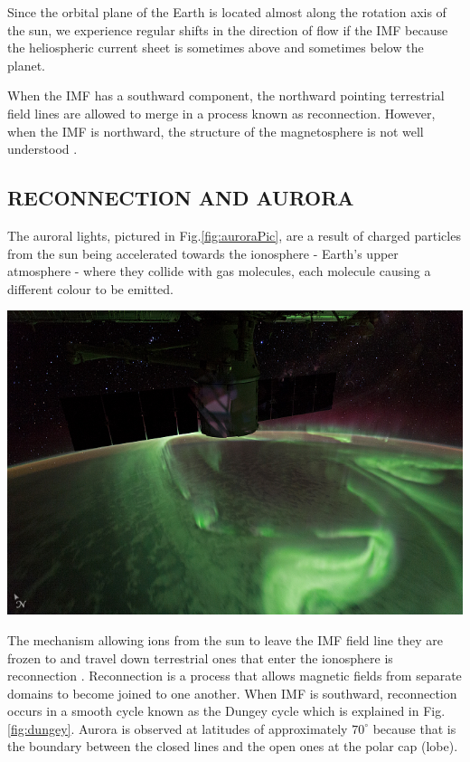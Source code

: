 \documentclass{article}
\newenvironment{Figure}
  {\par\medskip\noindent\minipage{\linewidth}}
  {\endminipage\par\medskip}
\begin{document}
\begin{multicols}{2}
Since the orbital plane of the Earth is located almost along the rotation axis of the sun, we experience regular shifts in the direction of flow if the IMF because the heliospheric current sheet is sometimes above and sometimes below the planet. 

When the IMF has a southward component, the northward pointing terrestrial field lines are allowed to merge in a process known as reconnection. However, when the IMF is northward, the structure of the magnetosphere is not well understood \cite{Fear1506}.

\subsection{RECONNECTION AND AURORA}
The auroral lights, pictured in Fig.\ref{fig:auroraPic}, are a result of charged particles from the sun being accelerated towards the ionosphere - Earth's upper atmosphere - where they collide with gas molecules, each molecule causing a different colour to be emitted. 

\begin{Figure}
    \centering
    \includegraphics[width=0.8\linewidth]{Aurora_australis_ISS.jpg}
    \label{fig:auroraPic}
\end{Figure}

The mechanism allowing ions from the sun to leave the IMF field line they are frozen to and travel down terrestrial ones that enter the ionosphere is reconnection \cite{Angelopoulos931}. Reconnection is a process that allows magnetic fields from separate domains to become joined to one another. When IMF is southward, reconnection occurs in a smooth cycle known as the Dungey cycle \cite{dungeyCycle} which is explained in Fig.\ref{fig:dungey}. Aurora is observed at latitudes of approximately $70^{\circ}$ because that is the boundary between the closed lines and the open ones at the polar cap (lobe).


\end{multicols}
\end{document}
